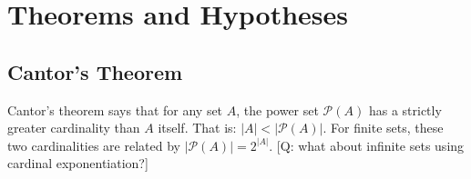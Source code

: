 



\section{Theorems and Hypotheses}

\subsection{Cantor's Theorem}
Cantor's theorem says that for any set $A$, the power set $\mathcal{P}(A)$ has a strictly greater cardinality than $A$ itself. That is: $|A| < |\mathcal{P}(A)|$. For finite sets, these two cardinalities are related by $|\mathcal{P}(A)| = 2^{|A|}$. [Q: what about infinite sets using cardinal exponentiation?]



